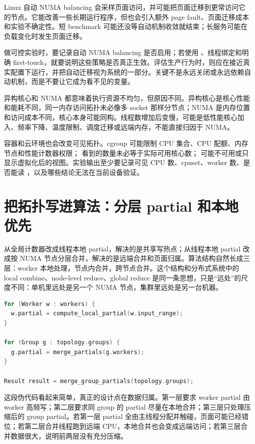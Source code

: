Linux 自动 NUMA balancing 会采样页面访问，并可能把页面迁移到更常访问它的节点。它能改善一些长期运行程序，但也会引入额外 page fault、页面迁移成本和实验不确定性。短 benchmark 可能还没等自动机制收敛就结束；长服务可能在负载变化时发生页面迁移。

做可控实验时，要记录自动 NUMA balancing 是否启用；若使用 、线程绑定和明确 first-touch，就要说明这些策略是否真正生效。评估生产行为时，则应在接近真实配置下运行，并把自动迁移视为系统的一部分。关键不是永远关闭或永远依赖自动机制，而是不要让它成为看不见的变量。

异构核心和 NUMA 都意味着执行资源不均匀，但原因不同。异构核心是核心性能和能耗不同，同一内存访问拓扑未必像多 socket 那样分节点；NUMA 是内存位置和访问成本不同，核心本身可能同构。线程数增加后变慢，可能是低性能核心加入、频率下降、温度限制、调度迁移或远端内存，不能直接归因于 NUMA。

容器和云环境也会改变可见拓扑。cgroup 可能限制 CPU 集合、CPU 配额、内存节点和性能计数器权限； 看到的数量未必等于实际可用核心数； 可能不可用或只显示虚拟化后的视图。实验输出至少要记录可见 CPU 数、cpuset、worker 数、是否能读 ，以及哪些结论无法在当前设备验证。

\section{把拓扑写进算法：分层 partial 和本地优先}

从全局计数器改成线程本地 partial，解决的是共享写热点；从线程本地 partial 改成按 NUMA 节点分层合并，解决的是远端合并和页面归属。算法结构自然长成三层：worker 本地处理，节点内合并，跨节点合并。这个结构和分布式系统中的 local combine、node-level reduce、global reduce 是同一条思想，只是“远处”的尺度不同：单机里远处是另一个 NUMA 节点，集群里远处是另一台机器。

\begin{lstlisting}[language=C++,caption={分层归约的抽象伪代码}]
for (Worker w : workers) {
  w.partial = compute_local_partial(w.input_range);
}

for (Group g : topology.groups) {
  g.partial = merge_partials(g.workers);
}

Result result = merge_group_partials(topology.groups);
\end{lstlisting}

这段伪代码看起来简单，真正的设计点在数据归属。第一层要求 worker partial 由 worker 高频写；第二层要求同 group 的 partial 尽量在本地合并；第三层只处理压缩后的 group partial。若第一层 partial 全由主线程分配并触碰，页面可能已经错位；若第二层合并线程跑到远端 CPU，本地合并也会变成远端访问；若第三层合并数据很大，说明前两层没有充分压缩。

